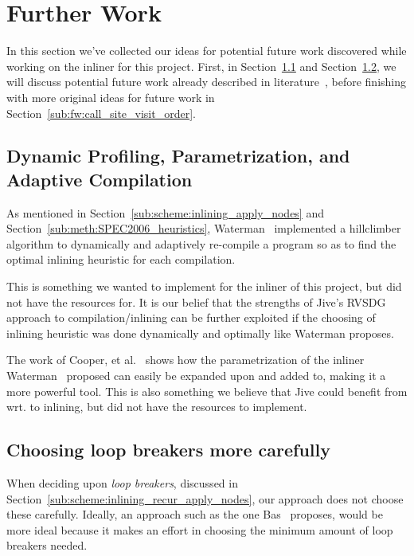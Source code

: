 
\clearpage
\section{Further Work}
\label{sec:further_work}

In this section we've collected our ideas for potential future work discovered
while working on the inliner for this project. First, in
Section~\ref{sub:fw:adaptiv_comp} and Section~\ref{sub:fw:optimal_loop_breakers},
we will discuss potential future work already described in
literature~\cite{AdaptvStratInlSubst,AdaptvCompilAndInlingWaterman,BasMscThesis},
before finishing with more original ideas for future work in Section~\ref{sub:fw:call_site_visit_order}.

\subsection{Dynamic Profiling, Parametrization, and Adaptive Compilation}
\label{sub:fw:adaptiv_comp}

As mentioned in Section~\ref{sub:scheme:inlining_apply_nodes} and
Section~\ref{sub:meth:SPEC2006_heuristics},
Waterman~\cite{AdaptvCompilAndInlingWaterman} implemented a hillclimber
algorithm to dynamically and adaptively re-compile a program so as to find the
optimal inlining heuristic for each compilation.

This is something we wanted to implement for the inliner of this project, but
did not have the resources for. It is our belief that the strengths of Jive's
RVSDG approach to compilation/inlining can be further exploited if the choosing
of inlining heuristic was done dynamically and optimally like Waterman proposes.

The work of Cooper, et al.~\cite{AdaptvStratInlSubst} shows how the
parametrization of the inliner Waterman~\cite{AdaptvCompilAndInlingWaterman}
proposed can easily be expanded upon and added to, making it a more powerful
tool. This is also something we believe that Jive could benefit from wrt. to
inlining, but did not have the resources to implement.

\subsection{Choosing loop breakers more carefully}
\label{sub:fw:optimal_loop_breakers}

When deciding upon \textit{loop breakers}, discussed in
Section~\ref{sub:scheme:inlining_recur_apply_nodes}, our approach does not
choose these carefully. Ideally, an approach such as the one
Bas~\cite{BasMscThesis} proposes, would be more ideal because it makes an effort
in choosing the minimum amount of loop breakers needed.

